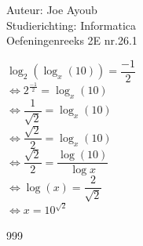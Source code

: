 \documentclass[a4paper]{article}
\begin{document}
  
\noindent \large Auteur: Joe Ayoub \\
\noindent \large Studierichting: Informatica\\
\noindent \large Oefeningenreeks 2E nr.26.1 \\

\medskip

\normalsize

$\log_{2}(\log_{x}(10)) = \dfrac{-1}{2}$ \\

$ \Leftrightarrow 2^{\tfrac{-1}{2}} = \log_{x}(10)$ \\

$ \Leftrightarrow \dfrac{1}{\sqrt{2}} = \log_{x}(10)$ \\

$ \Leftrightarrow \dfrac{\sqrt{2}}{2} = \log_{x}(10)$ \\

$ \Leftrightarrow \dfrac{\sqrt{2}}{2} = \dfrac{\log(10)}{\log{x}}$ \\

$ \Leftrightarrow \log(x) = \dfrac{2}{\sqrt{2}}$ \\

$ \Leftrightarrow x = 10^{\sqrt{2}}$ \\

\begin{thebibliography}{999}
\end{thebibliography}
\end{document}

